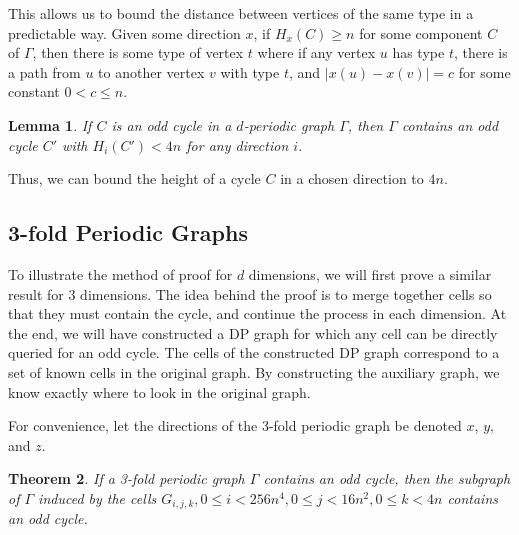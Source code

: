 \documentclass[letterpaper]{article}
\newtheorem{theorem}{Theorem}[section]
\newtheorem{lemma}[theorem]{Lemma}
\begin{document}
This allows us to bound the distance between vertices of the same type in a predictable way.
Given some direction $x$, if $H_x(C) \geq n$ for some component $C$ of $\Gamma$, then there is some type of vertex $t$ where if any vertex $u$ has type $t$, there is a path from $u$ to another vertex $v$ with type $t$, and $|x(u) - x(v)| = c$ for some constant $0 < c \leq n$.

\begin{lemma} \cite{bauslaugh05}
If $C$ is an odd cycle in a $d$-periodic graph $\Gamma$, then $\Gamma$ contains an odd cycle $C'$ with $H_i(C') < 4n$ for any direction $i$.
\end{lemma}

Thus, we can bound the height of a cycle $C$ in a chosen direction to $4n$.

\subsection{3-fold Periodic Graphs}
To illustrate the method of proof for $d$ dimensions, we will first prove a similar result for 3 dimensions.
The idea behind the proof is to merge together cells so that they must contain the cycle, and continue the process in each dimension.
At the end, we will have constructed a DP graph for which any cell can be directly queried for an odd cycle.
The cells of the constructed DP graph correspond to a set of known cells in the original graph.
By constructing the auxiliary graph, we know exactly where to look in the original graph.

For convenience, let the directions of the 3-fold periodic graph be denoted $x$, $y$, and $z$.

\begin{theorem}
If a 3-fold periodic graph $\Gamma$ contains an odd cycle, then the subgraph of $\Gamma$ induced by the cells $G_{i,j,k}, 0 \leq i < 256n^4, 0 \leq j < 16n^2, 0 \leq k < 4n$ contains an odd cycle.
\end{theorem}
\end{document}
